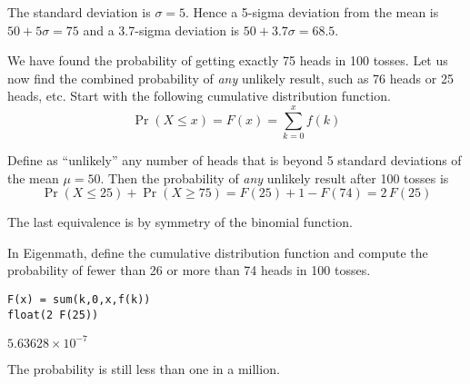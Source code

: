 The standard deviation is $\sigma=5$.
Hence a 5-sigma deviation from the mean is
$50+5\sigma=75$ and a
3.7-sigma deviation is $50+3.7\sigma=68.5$.

\bigskip
We have found the probability of getting exactly 75 heads in 100 tosses.
Let us now find the combined probability of {\it any} unlikely result,
such as 76 heads or 25 heads, etc.
Start with the following cumulative distribution function.
\begin{equation*}
\Pr(X\le x)=F(x)=\sum_{k=0}^xf(k)
\end{equation*}

Define as ``unlikely'' any number of heads that is beyond 5 standard deviations of the
mean $\mu=50$.
Then the probability of {\it any} unlikely result after 100 tosses is
\begin{equation*}
\Pr(X\le25)+\Pr(X\ge75)=F(25)+1-F(74)=2\,F(25)
\end{equation*}

The last equivalence is by symmetry of the binomial function.

\bigskip
In Eigenmath, define the cumulative distribution function and compute the probability
of fewer than 26 or more than 74 heads in 100 tosses.

{\color{blue}
\begin{verbatim}
F(x) = sum(k,0,x,f(k))
float(2 F(25))
\end{verbatim}}

$5.63628\times10^{-7}$

\bigskip
The probability is still less than one in a million.


